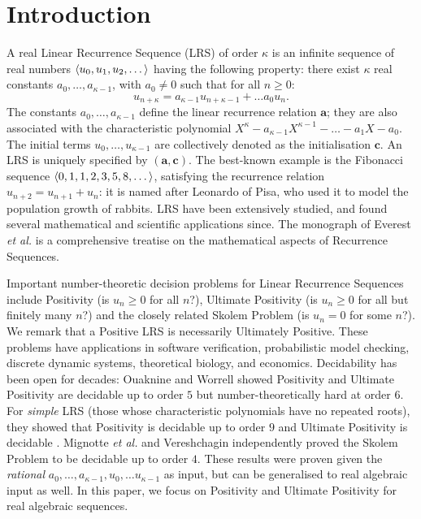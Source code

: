 \section{Introduction}
\label{section:intro}
A real Linear Recurrence Sequence (LRS) of order $\kappa$ is an infinite sequence of real numbers $\langle u_0, u_1, u_2, \dots\rangle$ having the following property: there exist $\kappa$ real constants $a_{0}, \dots, a_{\kappa-1}$, with $a_0 \ne 0$ such that for all $n \ge 0$:
\begin{equation}
u_{n+\kappa} = a_{\kappa-1}u_{n+\kappa-1} + \dots a_0 u_n.
\end{equation}
The constants $a_0, \dots, a_{\kappa-1}$ define the linear recurrence relation $\mathbf{a}$; they are also associated with the characteristic polynomial
$
X^\kappa - a_{\kappa-1}X^{\kappa-1} - \dots - a_1X - a_0.
$ 
The initial terms $u_0, \dots, u_{\kappa-1}$ are collectively denoted as the initialisation $\mathbf{c}$. An LRS is uniquely specified by $(\mathbf{a}, \mathbf{c})$. The best-known example is the Fibonacci sequence $\langle0, 1, 1, 2, 3, 5, 8, \dots\rangle$, satisfying the recurrence relation $u_{n+2} = u_{n+1} + u_n$: it is named after Leonardo of Pisa, who used it to model the population growth of rabbits. LRS have been extensively studied, and found several mathematical and scientific applications since. The monograph of Everest \textit{et al.} \cite{Everest2003RecurrenceS} is a comprehensive treatise on the mathematical aspects of Recurrence Sequences.

Important number-theoretic decision problems for Linear Recurrence Sequences include Positivity (is $u_n \ge 0$ for all $n$?), Ultimate Positivity (is $u_n \ge 0$ for all but finitely many $n$?) and the closely related Skolem Problem (is $u_n = 0$ for some $n$?). We remark that a Positive LRS is necessarily Ultimately Positive. These problems have applications in software verification, probabilistic model checking, discrete dynamic systems, theoretical biology, and economics. Decidability has been open for decades: Ouaknine and Worrell \cite{joeljames3} showed Positivity and Ultimate Positivity are decidable up to order $5$ but number-theoretically hard at order $6$. For \textit{simple} LRS (those whose characteristic polynomials have no repeated roots), they showed that Positivity is decidable up to order $9$ \cite{ouaknine2014positivity} and Ultimate Positivity is decidable \cite{ouaknine2014ultimate}. Mignotte \textit{et al.} \cite{mignotte} and Vereshchagin \cite{vereshchagin} independently proved the Skolem Problem to be decidable up to order $4$. These results were proven given the \textit{rational} $a_0, \dots, a_{\kappa-1}, u_0, \dots u_{\kappa-1}$ as input, but can be generalised to real algebraic input as well. In this paper, we focus on Positivity and Ultimate Positivity for real algebraic sequences.


